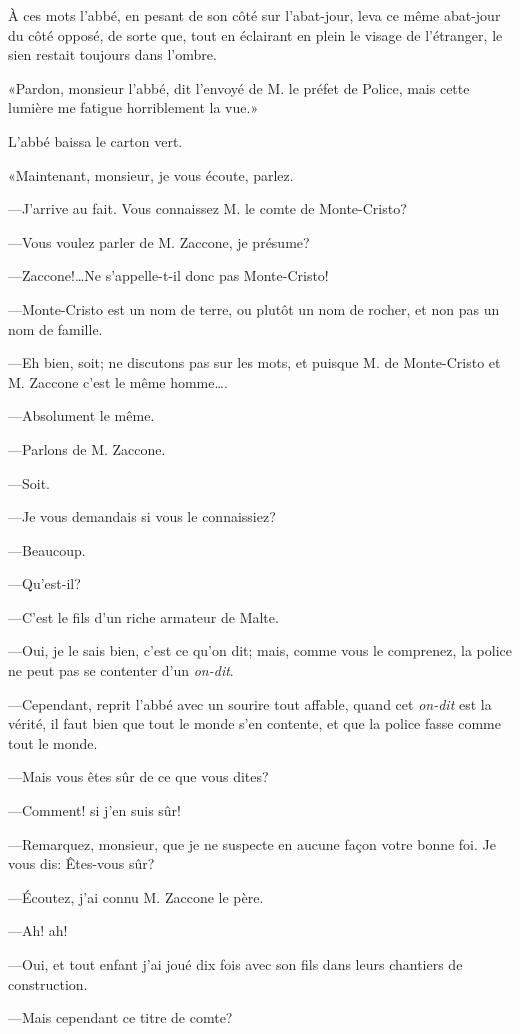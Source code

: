 À ces mots l'abbé, en pesant de son côté sur l'abat-jour, leva ce même abat-jour du côté opposé, de sorte que, tout en éclairant en plein le visage de l'étranger, le sien restait toujours dans l'ombre. 

«Pardon, monsieur l'abbé, dit l'envoyé de M. le préfet de Police, mais cette lumière me fatigue horriblement la vue.» 

L'abbé baissa le carton vert. 

«Maintenant, monsieur, je vous écoute, parlez. 

—J'arrive au fait. Vous connaissez M. le comte de Monte-Cristo? 

—Vous voulez parler de M. Zaccone, je présume? 

—Zaccone!\dots Ne s'appelle-t-il donc pas Monte-Cristo! 

—Monte-Cristo est un nom de terre, ou plutôt un nom de rocher, et non pas un nom de famille. 

—Eh bien, soit; ne discutons pas sur les mots, et puisque M. de Monte-Cristo et M. Zaccone c'est le même homme\dots. 

—Absolument le même. 

—Parlons de M. Zaccone. 

—Soit. 

—Je vous demandais si vous le connaissiez? 

—Beaucoup. 

—Qu'est-il? 

—C'est le fils d'un riche armateur de Malte.  

—Oui, je le sais bien, c'est ce qu'on dit; mais, comme vous le comprenez, la police ne peut pas se contenter d'un \textit{on-dit}. 

—Cependant, reprit l'abbé avec un sourire tout affable, quand cet \textit{on-dit} est la vérité, il faut bien que tout le monde s'en contente, et que la police fasse comme tout le monde. 

—Mais vous êtes sûr de ce que vous dites? 

—Comment! si j'en suis sûr! 

—Remarquez, monsieur, que je ne suspecte en aucune façon votre bonne foi. Je vous dis: Êtes-vous sûr? 

—Écoutez, j'ai connu M. Zaccone le père. 

—Ah! ah! 

—Oui, et tout enfant j'ai joué dix fois avec son fils dans leurs chantiers de construction. 

—Mais cependant ce titre de comte? 

